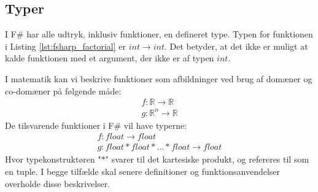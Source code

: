 \subsection{Typer}

I F\# har alle udtryk, inklusiv funktioner, en defineret type. Typen for funktionen i Listing \ref{lst:fsharp_factorial} er $int \rightarrow int$. Det betyder, at det ikke er muligt at kalde funktionen med et argument, der ikke er af typen $int$.

I matematik kan vi beskrive funktioner som afbildninger ved brug af domæner og co-domæner på følgende måde:
\begin{gather*}
    f: \mathbb{R} \to \mathbb{R} \\
    g: \mathbb{R}^n \to \mathbb{R}
\end{gather*}
De tilsvarende funktioner i F\# vil have typerne:
\begin{gather*}
    f: float \to float \\
    g: float * float * \ldots * float \to float
\end{gather*}
Hvor typekonstruktøren "$*$" svarer til det kartesiske produkt, og refereres til som en tuple. I begge tilfælde skal senere definitioner og funktionsanvendelser overholde disse beskrivelser. 


